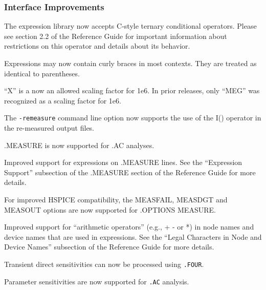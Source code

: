 \documentclass[letterpaper]{scrartcl}
\begin{document}
\subsubsection*{Interface Improvements}
\begin{XyceItemize}
\item The \Xyce{} expression library now accepts C-style ternary
  conditional operators.  Please see section 2.2 of the \Xyce{} Reference Guide
  for important information about restrictions on this operator and
  details about its behavior.
\item Expressions may now contain curly braces in most contexts.  They
  are treated as identical to parentheses.
\item ``X'' is a now an allowed scaling factor for 1e6.  In prior \Xyce{}
  releases, only ``MEG'' was recognized as a scaling factor for 1e6.
\item The \texttt{-remeasure} command line option now supports the use 
of the I() operator in the re-measured output files.
\item .MEASURE is now supported for .AC analyses.
\item Improved support for expressions on .MEASURE lines.  See the ``Expression
Support'' subsection of the .MEASURE section of the \Xyce{} Reference Guide 
for more details.
\item For improved HSPICE compatibility, the MEASFAIL, MEASDGT and MEASOUT
options are now supported for .OPTIONS MEASURE.
\item Improved support for ``arithmetic operators'' (e.g., + - or *) in node names
and device names that are used in expressions. See the ``Legal Characters in Node
and Device Names'' subsection of the \Xyce{} Reference Guide for more details.
\item Transient direct sensitivities can now be processed using \texttt{.FOUR}.
\item Parameter sensitivities are now supported for \texttt{.AC} analysis.
\end{XyceItemize}
\end{document}
